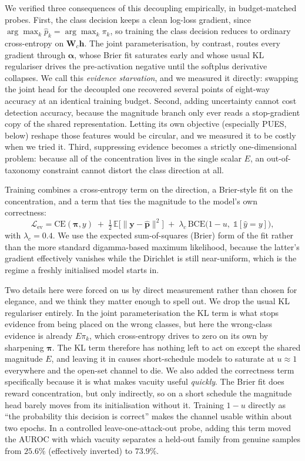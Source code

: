 \documentclass[conference]{IEEEtran}
\newcommand{\bs}[1]{\boldsymbol{#1}}
\begin{document}
We verified three consequences of this decoupling empirically, in budget-matched
probes. First, the class decision keeps a clean log-loss gradient, since
$\arg\max_{k}\hat{p}_{k}=\arg\max_{k}\pi_{k}$, so training the class decision
reduces to ordinary cross-entropy on $\bs{W}_{c}\bs{h}$. The joint parameterisation,
by contrast, routes every gradient through $\bs{\alpha}$, whose Brier fit saturates
early and whose usual KL regulariser drives the pre-activation negative until the
softplus derivative collapses. We call this \emph{evidence starvation}, and we
measured it directly: swapping the joint head for the decoupled one recovered
several points of eight-way accuracy at an identical training budget. Second, adding
uncertainty cannot cost detection accuracy, because the magnitude branch only ever
reads a stop-gradient copy of the shared representation. Letting its own objective
(especially PUES, below) reshape those features would be circular, and we measured
it to be costly when we tried it. Third, suppressing evidence becomes a strictly
one-dimensional problem: because all of the concentration lives in the single scalar
$E$, an out-of-taxonomy constraint cannot distort the class direction at all.

Training combines a cross-entropy term on the direction, a Brier-style fit on the
concentration, and a term that ties the magnitude to the model's own correctness:
\begin{equation}
\mathcal{L}_{\text{ev}} = \mathrm{CE}(\bs{\pi},y)
\;+\; \tfrac{1}{2}\,\mathbb{E}\bigl[\lVert \bs{y}-\hat{\bs{p}}\rVert^{2}\bigr]
\;+\; \lambda_{c}\,\mathrm{BCE}\bigl(1-u,\;\mathbb{1}[\hat{y}=y]\bigr),
\label{eq:evloss}
\end{equation}
with $\lambda_{c}=0.4$. We use the expected sum-of-squares (Brier) form of the fit
rather than the more standard digamma-based maximum likelihood, because the latter's
gradient effectively vanishes while the Dirichlet is still near-uniform, which is
the regime a freshly initialised model starts in.

Two details here were forced on us by direct measurement rather than chosen for
elegance, and we think they matter enough to spell out. We drop the usual KL
regulariser entirely. In the joint parameterisation the KL term is what stops
evidence from being placed on the wrong classes, but here the wrong-class evidence
is already $E\pi_{k}$, which cross-entropy drives to zero on its own by sharpening
$\bs{\pi}$. The KL term therefore has nothing left to act on except the shared
magnitude $E$, and leaving it in causes short-schedule models to saturate at
$u\approx1$ everywhere and the open-set channel to die. We also added the
correctness term specifically because it is what makes vacuity useful
\emph{quickly}. The Brier fit does reward concentration, but only indirectly, so on
a short schedule the magnitude head barely moves from its initialisation without it.
Training $1-u$ directly as ``the probability this decision is correct'' makes the
channel usable within about two epochs. In a controlled leave-one-attack-out probe,
adding this term moved the AUROC with which vacuity separates a held-out family from
genuine samples from $25.6\%$ (effectively inverted) to $73.9\%$.
\end{document}
